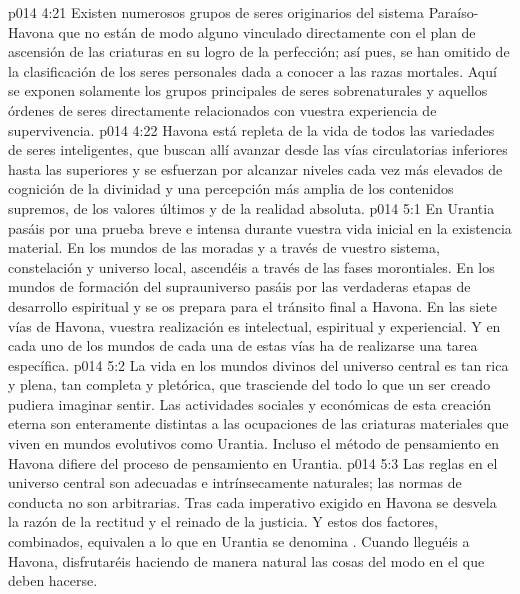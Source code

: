 \vs p014 4:21 Existen numerosos grupos de seres originarios del sistema Paraíso\hyp{}Havona que no están de modo alguno vinculado directamente con el plan de ascensión de las criaturas en su logro de la perfección; así pues, se han omitido de la clasificación de los seres personales dada a conocer a las razas mortales. Aquí se exponen solamente los grupos principales de seres sobrenaturales y aquellos órdenes de seres directamente relacionados con vuestra experiencia de supervivencia.
\vs p014 4:22 Havona está repleta de la vida de todos las variedades de seres inteligentes, que buscan allí avanzar desde las vías circulatorias inferiores hasta las superiores y se esfuerzan por alcanzar niveles cada vez más elevados de cognición de la divinidad y una percepción más amplia de los contenidos supremos, de los valores últimos y de la realidad absoluta.
\vs p014 5:1 En Urantia pasáis por una prueba breve e intensa durante vuestra vida inicial en la existencia material. En los mundos de las moradas y a través de vuestro sistema, constelación y universo local, ascendéis a través de las fases morontiales. En los mundos de formación del suprauniverso pasáis por las verdaderas etapas de desarrollo espiritual y se os prepara para el tránsito final a Havona. En las siete vías de Havona, vuestra realización es intelectual, espiritual y experiencial. Y en cada uno de los mundos de cada una de estas vías ha de realizarse una tarea específica.
\vs p014 5:2 La vida en los mundos divinos del universo central es tan rica y plena, tan completa y pletórica, que trasciende del todo lo que un ser creado pudiera imaginar sentir. Las actividades sociales y económicas de esta creación eterna son enteramente distintas a las ocupaciones de las criaturas materiales que viven en mundos evolutivos como Urantia. Incluso el método de pensamiento en Havona difiere del proceso de pensamiento en Urantia.
\vs p014 5:3 Las reglas en el universo central son adecuadas e intrínsecamente naturales; las normas de conducta no son arbitrarias. Tras cada imperativo exigido en Havona se desvela la razón de la rectitud y el reinado de la justicia. Y estos dos factores, combinados, equivalen a lo que en Urantia se denomina . Cuando lleguéis a Havona, disfrutaréis haciendo de manera natural las cosas del modo en el que deben hacerse.

